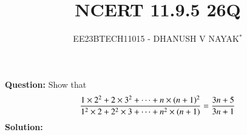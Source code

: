 \documentclass[journal,12pt,twocolumn]{IEEEtran}
\theoremstyle{remark}
\begin{document}

\vspace{3cm}

\title{NCERT 11.9.5 26Q}
\author{EE23BTECH11015 - DHANUSH V NAYAK$^{*}$%
}
\maketitle
\newpage
\bigskip

\renewcommand{\thefigure}{\theenumi}
\renewcommand{\thetable}{\theenumi}


\textbf{Question:} Show that
\begin{align}
    \frac{1\times2^2 + 2\times3^2 + \dots + n\times(n+1)^2}{1^2\times2 + 2^2\times3 + \dots + n^2\times(n+1)}  = \frac{3n+5}{3n+1}\notag
\end{align}
\textbf{Solution:}
\end{document}
